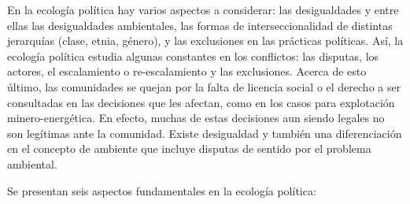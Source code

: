 \documentclass[
    a4paper,%
    DIV=calc,%
    abstract=true%
  ]{scrartcl}%
\begin{document}
  En la ecología política hay varios aspectos a considerar: las
  desigualdades y entre ellas las desigualdades ambientales, las formas
  de interseccionalidad de distintas jerarquías (clase, etnia, género),
  y las exclusiones en las prácticas políticas. Así, la ecología
  política estudia algunas constantes en los conflictos: las disputas,
  los actores, el escalamiento o re-escalamiento y las exclusiones.
  Acerca de esto último, las comunidades se quejan por la falta de
  licencia social o el derecho a ser consultadas en las decisiones que
  les afectan, como en los casos para explotación minero-energética. En
  efecto, muchas de estas decisiones aun siendo legales no son legítimas
  ante la comunidad. Existe desigualdad y también una diferenciación en
  el concepto de ambiente que incluye disputas de sentido por el
  problema ambiental.

  Se presentan seis aspectos fundamentales en la ecología política:
\end{document}
